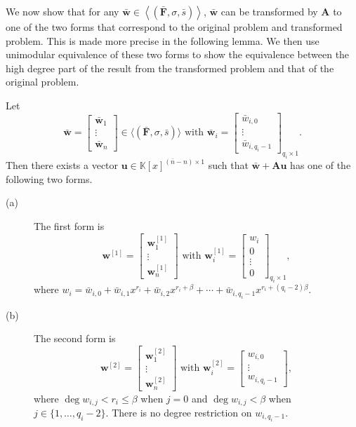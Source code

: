We now show that for any $\bar{\mathbf{w}}\in\left\langle \left(\bar{\mathbf{F}},\sigma,\bar{s}\right)\right\rangle $,
$\bar{\mathbf{w}}$ can be transformed by $\mathbf{A}$ to one of
the two forms that correspond to the original problem and transformed
problem. This is made more precise in the following lemma. We then
use unimodular equivalence of these two forms to show the equivalence
between the high degree part of the result from the transformed problem
and that of the original problem. 
\begin{lem}
Let \[
\bar{\mathbf{w}}=\begin{bmatrix}\bar{\mathbf{w}}_{1}\\
\vdots\\
\bar{\mathbf{w}}_{n}\end{bmatrix}\in\langle(\bar{\mathbf{F}},\sigma,\bar{s})\rangle\mbox{ with }\bar{\mathbf{w}}_{i}=\begin{bmatrix}\bar{w}_{i,0}\\
\vdots\\
\bar{w}_{i,q_{i}-1}\end{bmatrix}_{q_{i}\times1}.\]
 Then there exists a vector $\mathbf{u}\in\mathbb{K}\left[x\right]^{\left(\bar{n}-n\right)\times1}$
such that $\bar{\mathbf{w}}+\mathbf{A}\mathbf{u}$ has one of the
following two forms. 
\begin{description}
\item [{{{{(a)}}}}] The first form is \textup{\[
\mathbf{w}^{[1]}=\begin{bmatrix}\mathbf{w}_{1}^{[1]}\\
\vdots\\
\mathbf{w}_{n}^{[1]}\end{bmatrix}\mbox{ with }\mathbf{w}_{i}^{[1]}=\begin{bmatrix}w_{i}\\
0\\
\vdots\\
0\end{bmatrix}_{q_{i}\times1},\]
 } where \textup{$w_{i}=\bar{w}_{i,0}+\bar{w}_{i,1}x^{r_{i}}+\bar{w}_{i,2}x^{r_{i}+\beta}+\cdots+\bar{w}_{i,q_{i}-1}x^{r_{i}+(q_{i}-2)\beta}$.} 
\item [{{{{(b)}}}}] The second form is \[
\mathbf{w}^{[2]}=\begin{bmatrix}\mathbf{w}_{1}^{[2]}\\
\vdots\\
\mathbf{w}_{n}^{[2]}\end{bmatrix}\mbox{ with }\mathbf{w}_{i}^{[2]}=\begin{bmatrix}w_{i,0}\\
\vdots\\
w_{i,q_{i}-1}\end{bmatrix},\]
 where $\deg w_{i,j}<r_{i}\le\beta$ when $j=0$ and $\deg w_{i,j}<\beta$
when $j\in\{1,\dots,q_{i}-2\}$. There is no degree restriction on
$w_{i,q_{i}-1}$. 
\end{description}
\end{lem}

